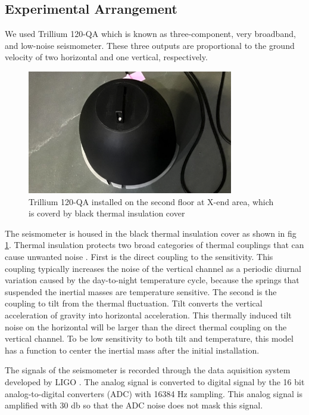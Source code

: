 \subsection{Experimental Arrangement}\label{sec:331}
We used Trillium 120-QA which is known as three-component, very broadband, and low-noise seismometer. These three outputs are proportional to the ground velocity of two horizontal and one vertical, respectively. 

\begin{figure}[h]
  \begin{center}   
    \includegraphics[width=9.0cm]{./img_chap3/img316.png}
    \caption{Trillium 120-QA installed on the second floor at X-end area, which is coverd by black thermal insulation cover}\label{img:img316}
  \end{center}
\end{figure}

The seismometer is housed in the black thermal insulation cover as shown in fig \ref{img:img316}. Thermal insulation protects two broad categories of thermal couplings that can cause unwanted noise \cite{trillium120manual}. First is the direct coupling to the sensitivity. This coupling typically increases the noise of the vertical channel as a periodic diurnal variation caused by the day-to-night temperature cycle, because the springs that suspended the inertial masses are temperature sensitive. The second is the coupling to tilt from the thermal fluctuation. Tilt converts the vertical acceleration of gravity into horizontal acceleration. This thermally induced tilt noise on the horizontal will be larger than the direct thermal coupling on the vertical channel. To be low sensitivity to both tilt and temperature, this model has a function to center the inertial mass after the initial installation.

The signals of the seismometer is recorded through the data aquisition system developed by LIGO \cite{bork2001overview}. The analog signal is converted to digital signal by the 16 bit analog-to-digital converters (ADC) with 16384 $\mathrm{Hz}$ sampling. This analog signal is amplified with 30 db so that the ADC noise does not mask this signal. 

